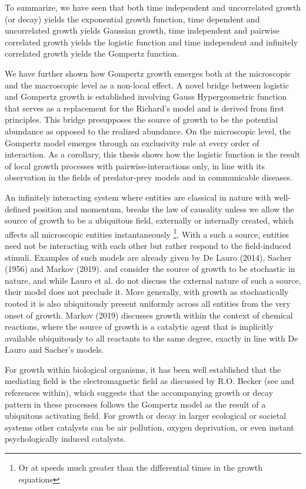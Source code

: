 \documentclass{article}
\begin{document}
To summarize, we have seen that both time independent and uncorrelated growth (or decay) yields the exponential growth function, time dependent and uncorrelated growth yields Gaussian growth, time independent and pairwise correlated growth yields the logistic function and time independent and infinitely correlated growth yields the Gompertz function. 

We have further shown how Gompertz growth emerges both at the microscopic and the macroscopic level as a non-local effect. A novel bridge between logistic and Gompertz growth is established involving Gauss Hypergeometric function that serves as a replacement for the Richard's model and is derived from first principles. This bridge presupposes the source of growth to be the potential abundance as opposed to the realized abundance. On the microscopic level, the Gompertz model emerges through an exclusivity rule at every order of interaction. As a corollary, this thesis shows how the logistic function is the result of local growth processes with pairwise-interactions only, in line with its observation in the fields of predator-prey models and in communicable diseases. 

An infinitely interacting system where entities are classical in nature with well-defined position and momentum, breaks the law of causality unless we allow the source of growth to be a ubiquitous field, externally or internally created, which affects all microscopic entities instantaneously \footnote{Or at speeds much greater than the differential times in the growth equations}. With a such a source, entities need not be interacting with each other but rather respond to the field-induced stimuli. Examples of such models are already given by De Lauro (2014), Sacher (1956) and Markov (2019). \citet{de2014stochastic} and \citet{sacher1956statistical} consider the source of growth to be stochastic in nature, and while Lauro et al. do not discuss the external nature of such a source, their model does not preclude it. More generally, with growth as stochastically rooted it is also ubiquitously present uniformly across all entities from the very onset of growth. Markov (2019)\cite{markov2019reaction} discusses growth within the context of chemical reactions, where the source of growth is a catalytic agent that is implicitly available ubiquitously to all reactants to the same degree, exactly in line with De Lauro and Sacher's models. 

For growth within biological organisms, it has been well established that the mediating field is the electromagnetic field as discussed by R.O. Becker (see \citet{becker1984electromagnetic} and references within), which suggests that the accompanying growth or decay pattern in these processes follows the Gompertz model as the result of a ubiquitous activating field. For growth or decay in larger ecological or societal systems other catalysts can be air pollution, oxygen deprivation, or even instant psychologically induced catalysts. 
\end{document}
